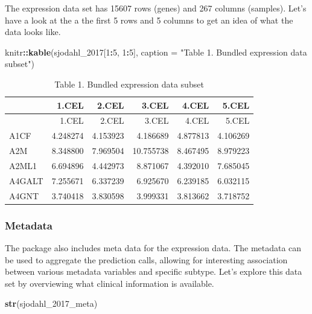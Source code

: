 \documentclass[
]{article}
\newenvironment{Shaded}{\begin{snugshade}}{\end{snugshade}}
\newcommand{\AttributeTok}[1]{\textcolor[rgb]{0.13,0.29,0.53}{#1}}
\newcommand{\DecValTok}[1]{\textcolor[rgb]{0.00,0.00,0.81}{#1}}
\newcommand{\FunctionTok}[1]{\textcolor[rgb]{0.13,0.29,0.53}{\textbf{#1}}}
\newcommand{\NormalTok}[1]{#1}
\newcommand{\SpecialCharTok}[1]{\textcolor[rgb]{0.81,0.36,0.00}{\textbf{#1}}}
\newcommand{\StringTok}[1]{\textcolor[rgb]{0.31,0.60,0.02}{#1}}
\begin{document}
The expression data set has 15607 rows (genes) and 267 columns
(samples). Let's have a look at the a the first 5 rows and 5 columns to
get an idea of what the data looks like.

\begin{Shaded}
\begin{Highlighting}[]
\NormalTok{knitr}\SpecialCharTok{::}\FunctionTok{kable}\NormalTok{(sjodahl\_2017[}\DecValTok{1}\SpecialCharTok{:}\DecValTok{5}\NormalTok{, }\DecValTok{1}\SpecialCharTok{:}\DecValTok{5}\NormalTok{], }
             \AttributeTok{caption =} \StringTok{"Table 1. Bundled expression data subset"}\NormalTok{)}
\end{Highlighting}
\end{Shaded}

\begin{longtable}[]{@{}lrrrrr@{}}
\caption{Table 1. Bundled expression data subset}\tabularnewline
\toprule\noalign{}
& 1.CEL & 2.CEL & 3.CEL & 4.CEL & 5.CEL \\
\midrule\noalign{}
\endfirsthead
\toprule\noalign{}
& 1.CEL & 2.CEL & 3.CEL & 4.CEL & 5.CEL \\
\midrule\noalign{}
\endhead
\bottomrule\noalign{}
\endlastfoot
A1CF & 4.248274 & 4.153923 & 4.186689 & 4.877813 & 4.106269 \\
A2M & 8.348800 & 7.969504 & 10.755738 & 8.467495 & 8.979223 \\
A2ML1 & 6.694896 & 4.442973 & 8.871067 & 4.392010 & 7.685045 \\
A4GALT & 7.255671 & 6.337239 & 6.925670 & 6.239185 & 6.032115 \\
A4GNT & 3.740418 & 3.830598 & 3.999331 & 3.813662 & 3.718752 \\
\end{longtable}

\subsubsection{Metadata}\label{metadata}

The package also includes meta data for the expression data. The
metadata can be used to aggregate the prediction calls, allowing for
interesting association between various metadata variables and specific
subtype. Let's explore this data set by overviewing what clinical
information is available.

\begin{Shaded}
\begin{Highlighting}[]
\FunctionTok{str}\NormalTok{(sjodahl\_2017\_meta)}
\end{Highlighting}
\end{Shaded}
\end{document}
